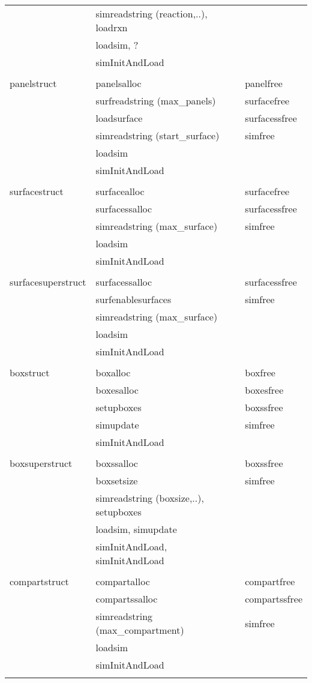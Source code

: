 \documentclass {scrbook}
\begin{document}
\begin{ttfamily}
\begin{longtable}[c]{lll}
&simreadstring (reaction,..), loadrxn\\
&loadsim, ?\\
&simInitAndLoad\\
\\
panelstruct&panelsalloc&panelfree\\
&surfreadstring (max\_panels)&surfacefree\\
&loadsurface&surfacessfree\\
&simreadstring (start\_surface)&simfree\\
&loadsim\\
&simInitAndLoad&\\
\\
surfacestruct&surfacealloc&surfacefree\\
&surfacessalloc&surfacessfree\\
&simreadstring (max\_surface)&simfree\\
&loadsim\\
&simInitAndLoad\\
\\
surfacesuperstruct&surfacessalloc&surfacessfree\\
&surfenablesurfaces&simfree\\
&simreadstring (max\_surface)\\
&loadsim\\
&simInitAndLoad\\
\\
boxstruct&boxalloc&boxfree\\
&boxesalloc&boxesfree\\
&setupboxes&boxssfree\\
&simupdate&simfree\\
&simInitAndLoad\\
\\
boxsuperstruct&boxssalloc&boxssfree\\
&boxsetsize&simfree\\
&simreadstring (boxsize,..), setupboxes\\
&loadsim, simupdate\\
&simInitAndLoad, simInitAndLoad\\
\\
compartstruct&compartalloc&compartfree\\
&compartssalloc&compartssfree\\
&simreadstring (max\_compartment)&simfree\\
&loadsim\\
&simInitAndLoad\\
\\

\end{longtable}
\end{ttfamily}
\end{document}
